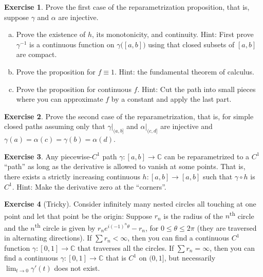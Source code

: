 \documentclass[12pt,openany]{book}
\newcommand{\C}{{\mathbb{C}}}
\newcommand{\myquote}[1]{``#1''}
\theoremstyle{plain}
\theoremstyle{remark}
\theoremstyle{definition}
\newenvironment{exbox}{%
    \def\FrameCommand{\vrule width 1pt \relax\hspace{10pt}}%
    \MakeFramed{\advance\hsize-\width\FrameRestore}%
}{%
    \endMakeFramed
}
\newenvironment{exparts}{%
    \leavevmode\begin{enumerate}[a),noitemsep,topsep=0pt,parsep=0pt,partopsep=0pt]
}{%
    \end{enumerate}
}
\theoremstyle{exercise}
\newtheorem{exercise}{Exercise}[section]
\theoremstyle{example}
\begin{document}
\begin{exbox}
\begin{exercise}
Prove the first case of the reparametrization proposition, that is,
suppose $\gamma$ and $\alpha$ are injective.
\begin{exparts}
\item
Prove the existence of $h$, its monotonicity, and continuity.
Hint: First prove $\gamma^{-1}$ is a continuous function on
$\gamma\bigl([a,b]\bigr)$ using that closed subsets of $[a,b]$
are compact.
\item
Prove the proposition for $f\equiv 1$.
Hint: the fundamental theorem of calculus.
\item
Prove the proposition for continuous $f$.
Hint: Cut the path into small pieces where
you can approximate $f$ by a constant and apply the
last part.
\end{exparts}
\end{exercise}

\begin{exercise}
Prove the second case of the reparametrization, that is,
for simple closed paths assuming only that $\gamma|_{(a,b]}$ and
$\alpha|_{(c,d]}$ are injective and
$\gamma(a)=\alpha(c)=\gamma(b)=\alpha(d)$.
\end{exercise}

\begin{exercise}
Any piecewise-$C^1$ path $\gamma \colon [a,b] \to \C$
can be reparametrized to a $C^1$ \myquote{path} as long as the derivative
is allowed to vanish at some points.
That is, there exists a strictly increasing
continuous $h \colon [a,b] \to [a,b]$ such that
$\gamma \circ h$ is $C^1$.
Hint: Make the derivative zero at the \myquote{corners}.
\end{exercise}

\begin{exercise}[Tricky]
Consider infinitely many nested circles all touching at one point
and let that point be the origin: Suppose $r_n$ is the radius of the
$n$\textsuperscript{th}
circle and the $n$\textsuperscript{th} circle is given by $r_n e^{i(-1)^n\theta} - r_n$, for $0 \leq
\theta \leq 2\pi$ (they are traversed in alternating directions).
If $\sum r_n < \infty$, then you can find a continuous
$C^1$ function $\gamma \colon
[0,1] \to \C$ that traverses all the circles.  If $\sum r_n = \infty$, then
you can find a continuous $\gamma \colon [0,1] \to \C$ that is $C^1$ on
$(0,1]$, but necessarily $\lim_{t \to 0} \gamma'(t)$ does not exist.
\end{exercise}
\end{exbox}
\end{document}
